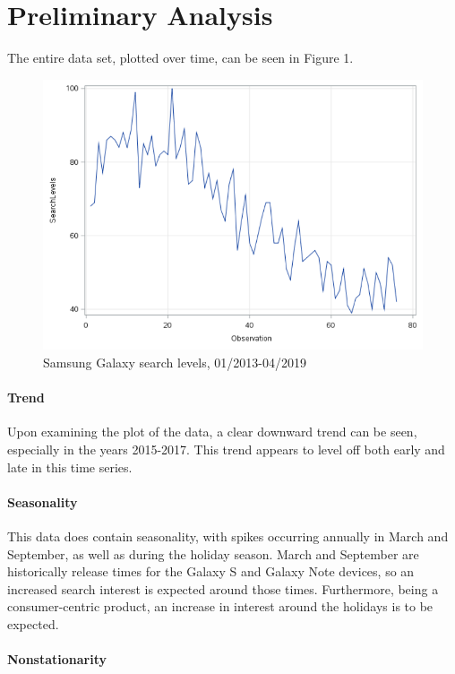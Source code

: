 \documentclass[12pt]{article}
\begin{document}
	\section{Preliminary Analysis}
	
	The entire data set, plotted over time, can be seen in Figure 1.
	
\begin{figure}
		\includegraphics[scale=.7]{All_Plot.PNG}
		\caption{Samsung Galaxy search levels, 01/2013-04/2019}
\end{figure}

	
\paragraph{Trend}

	Upon examining the plot of the data, a clear downward trend can be seen, especially in the years 2015-2017.  This trend appears to level off both early and late in this time series.

\paragraph{Seasonality}

	This data does contain seasonality, with spikes occurring annually in March and September, as well as during the holiday season.  March and September are historically release times for the Galaxy S and Galaxy Note devices, so an increased search interest is expected around those times.  Furthermore, being a consumer-centric product, an increase in interest around the holidays is to be expected.

\paragraph{Nonstationarity}
	
\end{document}
